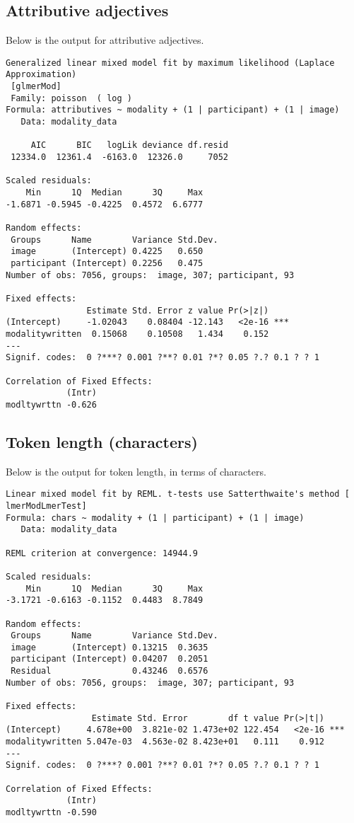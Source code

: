 \documentclass[11pt]{article}
\begin{document}
\subsection{Attributive adjectives}
Below is the output for attributive adjectives.
\begin{verbatim}
Generalized linear mixed model fit by maximum likelihood (Laplace  Approximation)
 [glmerMod]
 Family: poisson  ( log )
Formula: attributives ~ modality + (1 | participant) + (1 | image)
   Data: modality_data

     AIC      BIC   logLik deviance df.resid 
 12334.0  12361.4  -6163.0  12326.0     7052 

Scaled residuals: 
    Min      1Q  Median      3Q     Max 
-1.6871 -0.5945 -0.4225  0.4572  6.6777 

Random effects:
 Groups      Name        Variance Std.Dev.
 image       (Intercept) 0.4225   0.650   
 participant (Intercept) 0.2256   0.475   
Number of obs: 7056, groups:  image, 307; participant, 93

Fixed effects:
                Estimate Std. Error z value Pr(>|z|)    
(Intercept)     -1.02043    0.08404 -12.143   <2e-16 ***
modalitywritten  0.15068    0.10508   1.434    0.152    
---
Signif. codes:  0 ?***? 0.001 ?**? 0.01 ?*? 0.05 ?.? 0.1 ? ? 1

Correlation of Fixed Effects:
            (Intr)
modltywrttn -0.626
\end{verbatim}

\subsection{Token length (characters)}
Below is the output for token length, in terms of characters.
\begin{verbatim}
Linear mixed model fit by REML. t-tests use Satterthwaite's method [
lmerModLmerTest]
Formula: chars ~ modality + (1 | participant) + (1 | image)
   Data: modality_data

REML criterion at convergence: 14944.9

Scaled residuals: 
    Min      1Q  Median      3Q     Max 
-3.1721 -0.6163 -0.1152  0.4483  8.7849 

Random effects:
 Groups      Name        Variance Std.Dev.
 image       (Intercept) 0.13215  0.3635  
 participant (Intercept) 0.04207  0.2051  
 Residual                0.43246  0.6576  
Number of obs: 7056, groups:  image, 307; participant, 93

Fixed effects:
                 Estimate Std. Error        df t value Pr(>|t|)    
(Intercept)     4.678e+00  3.821e-02 1.473e+02 122.454   <2e-16 ***
modalitywritten 5.047e-03  4.563e-02 8.423e+01   0.111    0.912    
---
Signif. codes:  0 ?***? 0.001 ?**? 0.01 ?*? 0.05 ?.? 0.1 ? ? 1

Correlation of Fixed Effects:
            (Intr)
modltywrttn -0.590
\end{verbatim}
\end{document}
